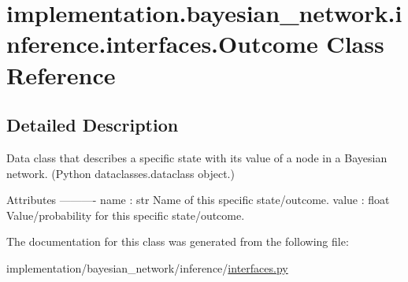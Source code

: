 \hypertarget{classimplementation_1_1bayesian__network_1_1inference_1_1interfaces_1_1_outcome}{}\section{implementation.\+bayesian\+\_\+network.\+inference.\+interfaces.\+Outcome Class Reference}
\label{classimplementation_1_1bayesian__network_1_1inference_1_1interfaces_1_1_outcome}


\subsection{Detailed Description}
\begin{DoxyVerb}Data class that describes a specific state with its value of a node in a Bayesian network.
(Python dataclasses.dataclass object.)

Attributes
----------
name : str
    Name of this specific state/outcome.
value : float
    Value/probability for this specific state/outcome.
\end{DoxyVerb}
 

The documentation for this class was generated from the following file\+:\begin{DoxyCompactItemize}
\item 
implementation/bayesian\+\_\+network/inference/\hyperlink{interfaces_8py}{interfaces.\+py}\end{DoxyCompactItemize}
